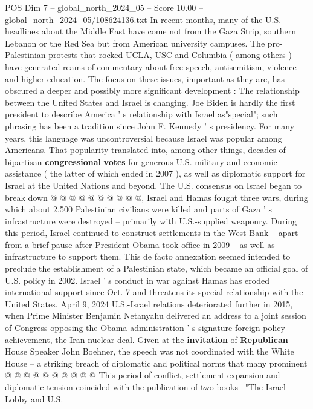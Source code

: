 \begin{textsample}{POS Dim 7 – global\_north\_2024\_05 – Score 10.00 – global\_north\_2024\_05/108624136.txt}  \label{ex:f7_pos_053}
In recent months, many of the U.S. headlines about the Middle East have come not from the Gaza Strip, southern Lebanon or the Red Sea but from American university campuses.
The pro-Palestinian protests that rocked UCLA, USC and Columbia ( among others ) have generated reams of commentary about free speech, antisemitism, violence and higher education.
The focus on these issues, important as they are, has obscured a deeper and possibly more significant development : The relationship between the United States and Israel is changing.
Joe Biden is hardly the first president to describe America ' s relationship with Israel as"special"; such phrasing has been a tradition since John F.
Kennedy ' s presidency.
For many years, this language was uncontroversial because Israel was popular among Americans.
That popularity translated into, among other things, decades of bipartisan \textbf{congressional} \textbf{votes} for generous U.S. military and economic assistance ( the latter of which ended in 2007 ), as well as diplomatic support for Israel at the United Nations and beyond.
The U.S. consensus on Israel began to break down @ @ @ @ @ @ @ @ @ @, Israel and Hamas fought three wars, during which about 2,500 Palestinian civilians were killed and parts of Gaza ' s infrastructure were destroyed -- primarily with U.S.-supplied weaponry.
During this period, Israel continued to construct settlements in the West Bank -- apart from a brief pause after President Obama took office in 2009 -- as well as infrastructure to support them.
This de facto annexation seemed intended to preclude the establishment of a Palestinian state, which became an official goal of U.S. policy in 2002.
Israel ' s conduct in war against Hamas has eroded international support since Oct. 7 and threatens its special relationship with the United States.
April 9, 2024 U.S.-Israel relations deteriorated further in 2015, when Prime Minister Benjamin Netanyahu delivered an address to a joint session of Congress opposing the Obama administration ' s signature foreign policy achievement, the Iran nuclear deal.
Given at the \textbf{invitation} of \textbf{Republican} House Speaker John Boehner, the speech was not coordinated with the White House -- a striking breach of diplomatic and political norms that many prominent @ @ @ @ @ @ @ @ @ @ This period of conflict, settlement expansion and diplomatic tension coincided with the publication of two books --"The Israel Lobby and U.S.

\end{textsample}
